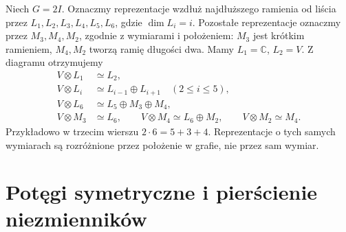 \begin{przyklad}
Niech $G=2I$. Oznaczmy reprezentacje wzdłuż najdłuższego
ramienia od liścia przez $L_1,L_2,L_3,L_4,L_5,L_6$,
gdzie $\dim L_i=i$. Pozostałe reprezentacje oznaczmy
przez $M_3,M_4,M_2$, zgodnie z wymiarami i położeniem:
$M_3$ jest krótkim ramieniem, $M_4,M_2$ tworzą
ramię długości dwa. Mamy $L_1=\mathbb C$, $L_2=V$.
Z diagramu otrzymujemy
\[
\begin{aligned}
 V\otimes L_1&\simeq L_2,\\
 V\otimes L_i&\simeq L_{i-1}\oplus L_{i+1}\quad(2\le i\le5),\\
 V\otimes L_6&\simeq L_5\oplus M_3\oplus M_4,\\
 V\otimes M_3&\simeq L_6,\qquad
 V\otimes M_4\simeq L_6\oplus M_2,\qquad
 V\otimes M_2\simeq M_4.
\end{aligned}
\]
Przykładowo w trzecim wierszu $2\cdot6=5+3+4$.
Reprezentacje o tych samych wymiarach są rozróżnione
przez położenie w grafie, nie przez sam wymiar.
\end{przyklad}

\section{Potęgi symetryczne i pierścienie niezmienników}

